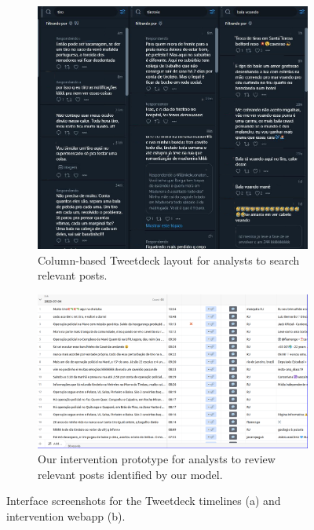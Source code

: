 \documentclass[11pt,letterpaper]{article}
\begin{document}
\begin{figure}[h]
    \centering
    \begin{subfigure}[t]{0.45\textwidth}
        \centering
        \vspace{0pt} %
        \includegraphics[width=\textwidth]{figs/tweetdeck.jpeg}
        \caption{Column-based Tweetdeck layout for analysts to search relevant posts.}
        \label{fig:tweetdeck}
    \end{subfigure}
    \hfill
    \begin{subfigure}[t]{0.45\textwidth}
        \centering
        \vspace{0pt} %
        \includegraphics[width=\textwidth]{figs/airtable.png}
        \caption{Our intervention prototype for analysts to review relevant posts identified by our model.}
        \label{fig:airtable}
    \end{subfigure}
    \caption{Interface screenshots for the Tweetdeck timelines (a) and intervention webapp (b).}
    \label{fig:screenshots}
\end{figure}
\end{document}
